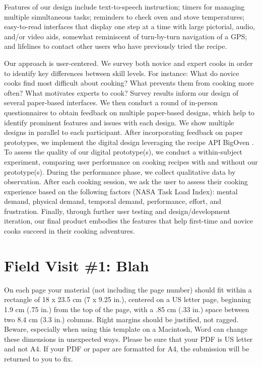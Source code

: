 \documentclass{sigchi}
\begin{document}
Features of our design include text-to-speech instruction; timers for managing multiple simultaneous tasks; reminders to check oven and stove temperatures; easy-to-read interfaces that display one step at a time with large pictorial, audio, and/or video aids, somewhat reminiscent of turn-by-turn navigation of a GPS; and lifelines to contact other users who have previously tried the recipe.

Our approach is user-centered. We survey both novice and expert cooks in order to identify key differences between skill levels. For instance: What do novice cooks find most difficult about cooking? What prevents them from cooking more often? What motivates experts to cook? Survey results inform our design of several paper-based interfaces. We then conduct a round of in-person questionnaires to obtain feedback on multiple paper-based designs, which help to identify prominent features and issues with each design. We show multiple designs in parallel to each participant. After incorporating feedback on paper prototypes, we implement the digital design leveraging the recipe API BigOven \cite{api_oven}. To assess the quality of our digital prototype(s), we conduct a within-subject experiment, comparing user performance on cooking recipes with and without our prototype(s). During the performance phase, we collect qualitative data by observation. After each cooking session, we ask the user to assess their cooking experience based on the following factors (NASA Task Load Index): mental demand, physical demand, temporal demand, performance, effort, and frustration. Finally, through further user testing and design/development iteration, our final product embodies the features that help first-time and novice cooks succeed in their cooking adventures.

\section{Field Visit \#1: Blah}

On each page your material (not including the page number) should fit
within a rectangle of 18 x 23.5 cm (7 x 9.25 in.), centered on a US
letter page, beginning 1.9 cm (.75 in.) from the top of the page, with
a .85 cm (.33 in.) space between two 8.4 cm (3.3 in.) columns.  Right
margins should be justified, not ragged. Beware, especially when using
this template on a Macintosh, Word can change these dimensions in
unexpected ways. Please be sure that your PDF is US letter and not
A4. If your PDF or paper are formatted for A4, the submission will be
returned to you to fix.
\end{document}
